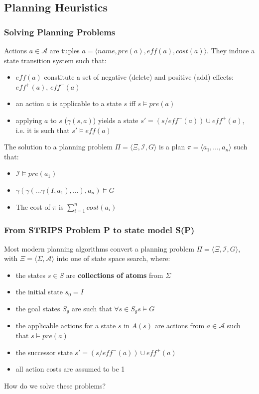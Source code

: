 \documentclass{beamer}
\begin{document}
\subsection{Planning Heuristics}
	
	\begin{frame}[c]\frametitle{Solving Planning Problems}
		Actions $a \in \mathcal{A}$ are tuples $a = \langle \mathit{name}, \mathit{pre}(a), \mathit{eff}(a), \mathit{cost}(a) \rangle$.
		They induce a state transition system such that:
		\begin{itemize}
			\item $\mathit{eff}(a)$ constitute a set of negative (delete) and positive (add) effects: $\mathit{eff}^{+}(a)$, $\mathit{eff}^{-}(a)$
			\item an action $a$ is applicable to a state $s$ iff $s \models \mathit{pre}(a)$
			\item applying $a$ to $s$ ($\gamma(s,a)$) yields a state $s' = (s / \mathit{eff}^{-}(a)) \cup  \mathit{eff}^{+}(a)$, \\i.e. it is such that $s' \models \mathit{eff}(a)$
		\end{itemize}
		The solution to a planning problem $\Pi = \langle \Xi, \mathcal{I}, G\rangle$ is a plan $\pi = \langle a_1, \dots, a_n\rangle$ such that:
		\begin{itemize}
			\item $\mathcal{I} \models \mathit{pre}(a_1)$
			\item $\gamma(\gamma(\dots \gamma(I, a_1),\dots), a_n) \models G$
			\item The cost of $\pi$ is $\sum_{i=1}^{n}\mathit{cost}(a_i)$
		\end{itemize}
	\end{frame}
	
	\begin{frame}[c]\frametitle{From STRIPS Problem P to state model S(P)}
		Most modern planning algorithms convert a planning problem $\Pi = \langle \Xi, \mathcal{I}, G\rangle$, with $\Xi = \langle \Sigma, \mathcal{A} \rangle$ into one of state space search, where:
		\begin{itemize}
			\item the states $s \in S$ are \textbf{collections of atoms} from $\Sigma$
			\item the initial state $s_0 = I$
			\item the goal states $S_g$ are such that $\forall{s \in S_g} s \models G$
			\item the applicable actions for a state $s$ in $A(s)$ are actions from $a \in  \mathcal{A}$ such that $s \models \mathit{pre}(a)$
			\item the successor state $s' = (s / \mathit{eff}^{-}(a)) \cup  \mathit{eff}^{+}(a)$
			\item all action costs are assumed to be 1
		\end{itemize}
		How do we solve these problems?
	\end{frame}
	
\end{document}
